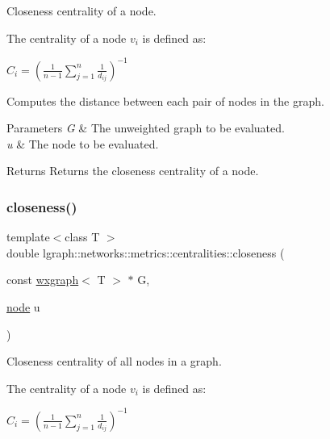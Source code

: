 Closeness centrality of a node. 

The centrality of a node $v_i$ is defined as\+:

$C_i = \left( \frac{1}{n - 1} \sum_{j=1}^n \frac{1}{d_{ij}} \right)^{-1}$

Computes the distance between each pair of nodes in the graph. 
\begin{DoxyParams}{Parameters}
{\em G} & The unweighted graph to be evaluated. \\
\hline
{\em u} & The node to be evaluated. \\
\hline
\end{DoxyParams}
\begin{DoxyReturn}{Returns}
Returns the closeness centrality of a node. 
\end{DoxyReturn}
\mbox{\label{namespacelgraph_1_1networks_1_1metrics_1_1centralities_a641608dcaecba5d3636237bd15da2e96}} 
\subsubsection{\texorpdfstring{closeness()}{closeness()}\hspace{0.1cm}{\footnotesize\ttfamily [2/6]}}
{\footnotesize\ttfamily template$<$class T $>$ \\
double lgraph\+::networks\+::metrics\+::centralities\+::closeness (\begin{DoxyParamCaption}\item[{const \hyperlink{classlgraph_1_1wxgraph}{wxgraph}$<$ T $>$ $\ast$}]{G,  }\item[{\hyperlink{namespacelgraph_a397169dd66adf725210a30fb7251773e}{node}}]{u }\end{DoxyParamCaption})}



Closeness centrality of all nodes in a graph. 

The centrality of a node $v_i$ is defined as\+:

$C_i = \left( \frac{1}{n - 1} \sum_{j=1}^n \frac{1}{d_{ij}} \right)^{-1}$

